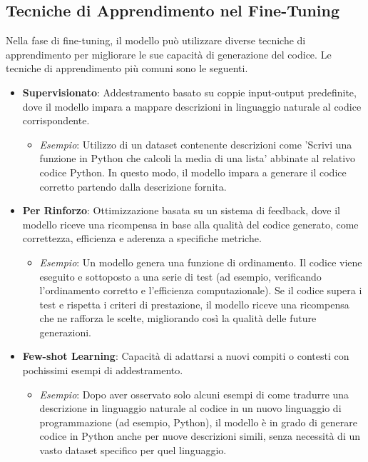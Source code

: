 \documentclass[12pt,a4paper,openright,twoside]{book}
\begin{document}
\subsection{Tecniche di Apprendimento nel Fine-Tuning}
Nella fase di fine-tuning, il modello può utilizzare diverse tecniche di apprendimento per migliorare le sue capacità di generazione del codice.
Le tecniche di apprendimento più comuni sono le seguenti.
    \begin{itemize}
        \item \textbf{Supervisionato}: 
            Addestramento basato su coppie input-output predefinite, dove il modello impara a mappare descrizioni in linguaggio naturale al codice corrispondente.
            \begin{itemize}
                \item \textit{Esempio}: Utilizzo di un dataset contenente descrizioni come 'Scrivi una funzione in Python che calcoli la media di una lista' abbinate al relativo codice Python. In questo modo, il modello impara a generare il codice corretto partendo dalla descrizione fornita.
            \end{itemize}
            
        \item \textbf{Per Rinforzo}: 
            Ottimizzazione basata su un sistema di feedback, dove il modello riceve una ricompensa in base alla qualità del codice generato, come correttezza, efficienza e aderenza a specifiche metriche.
            \begin{itemize}
                \item \textit{Esempio}: Un modello genera una funzione di ordinamento. Il codice viene eseguito e sottoposto a una serie di test (ad esempio, verificando l'ordinamento corretto e l'efficienza computazionale). Se il codice supera i test e rispetta i criteri di prestazione, il modello riceve una ricompensa che ne rafforza le scelte, migliorando così la qualità delle future generazioni.
            \end{itemize}
            
        \item \textbf{Few-shot Learning}: 
            Capacità di adattarsi a nuovi compiti o contesti con pochissimi esempi di addestramento.
            \begin{itemize}
                \item \textit{Esempio}: Dopo aver osservato solo alcuni esempi di come tradurre una descrizione in linguaggio naturale al codice in un nuovo linguaggio di programmazione (ad esempio, Python), il modello è in grado di generare codice in Python anche per nuove descrizioni simili, senza necessità di un vasto dataset specifico per quel linguaggio.
            \end{itemize}
    \end{itemize}
\end{document}
